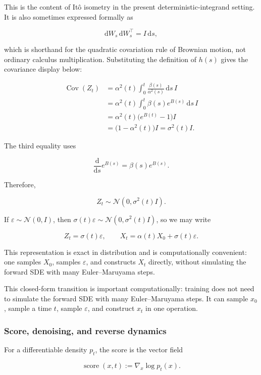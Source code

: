 \documentclass[11pt,a4paper]{article}
\theoremstyle{definition}
\begin{document}
\begin{note}
This is the content of It\^o isometry in the present deterministic-integrand setting.
It is also sometimes expressed formally as

\[
\mathrm{d}W_s\,\mathrm{d}W_s^{\top}=I\,\mathrm{d}s,
\]

which is shorthand for the quadratic covariation rule of Brownian motion, not ordinary
calculus multiplication. Substituting the definition of $h(s)$ gives the covariance
display below:

\[
\begin{aligned}
\operatorname{Cov}(Z_t)
&=
\alpha^2(t)\int_0^t
\frac{\beta(s)}{\alpha^2(s)}\,\mathrm{d}s\,I \\
&=
\alpha^2(t)\int_0^t
\beta(s)e^{B(s)}\,\mathrm{d}s\,I \\
&=
\alpha^2(t)\bigl(e^{B(t)}-1\bigr)I \\
&=
\bigl(1-\alpha^2(t)\bigr)I
=\sigma^2(t)I.
\end{aligned}
\]

The third equality uses

\[
\frac{\mathrm{d}}{\mathrm{d}s}e^{B(s)}
=\beta(s)e^{B(s)}.
\]

Therefore,

\[
Z_t\sim\mathcal{N}\left(0,\sigma^2(t)I\right).
\]

If $\varepsilon\sim\mathcal{N}(0,I)$, then
$\sigma(t)\varepsilon\sim\mathcal{N}(0,\sigma^2(t)I)$, so we may write

\[
Z_t=\sigma(t)\varepsilon,
\qquad
X_t=\alpha(t)X_0+\sigma(t)\varepsilon.
\]

This representation is exact in distribution and is computationally convenient: one
samples $X_0$, samples $\varepsilon$, and constructs $X_t$ directly, without simulating
the forward SDE with many Euler--Maruyama steps.
\end{note}

This closed-form transition is important computationally: training does not need to
simulate the forward SDE with many Euler--Maruyama steps. It can sample $x_0$, sample a
time $t$, sample $\varepsilon$, and construct $x_t$ in one operation.

\subsubsection{Score, denoising, and reverse dynamics}

For a differentiable density $p_t$, the score is the vector field

\[
\operatorname{score}(x,t):=\nabla_x\log p_t(x).
\]
\end{document}
